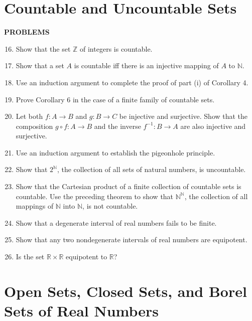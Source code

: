 \documentclass[a4paper,10pt]{book}
\theoremstyle{plain} %
\begin{document}
\section{Countable and Uncountable Sets}

\begin{center}
	\textbf{PROBLEMS}
\end{center}
\begin{enumerate}
	\setcounter{enumi}{15}
	\item Show that the set $\mathbb{Z}$ of integers is countable.
	\item Show that a set $A$ is countable iff there is an injective mapping of $A$ to $\mathbb{N}$.
	\item Use an induction argument to complete the proof of part (i) of Corollary 4.
	\item Prove Corollary 6 in the case of a finite family of countable sets.
	\item Let both $f:A \to B$ and $g:B \to C$ be injective and surjective. Show that the composition $g \circ f:A \to B$ and the inverse $f^{-1}:B \to A$ are also injective and surjective.
	\item Use an induction argument to establish the pigeonhole principle.
	\item Show that $2^{\mathbb{N}}$, the collection of all sets of natural numbers, is uncountable.
	\item Show that the Cartesian product of a finite collection of countable sets is countable. Use the preceding theorem to show that $\mathbb{N}^{\mathbb{N}}$, the collection of all mappings of $\mathbb{N}$ into $\mathbb{N}$, is not countable.
	\item Show that a degenerate interval of real numbers fails to be finite.
	\item Show that any two nondegenerate intervals of real numbers are equipotent.
	\item Is the set $\mathbb{R} \times \mathbb{R}$ equipotent to $\mathbb{R}$?
\end{enumerate}

\section{Open Sets, Closed Sets, and Borel Sets of Real Numbers}
\end{document}
